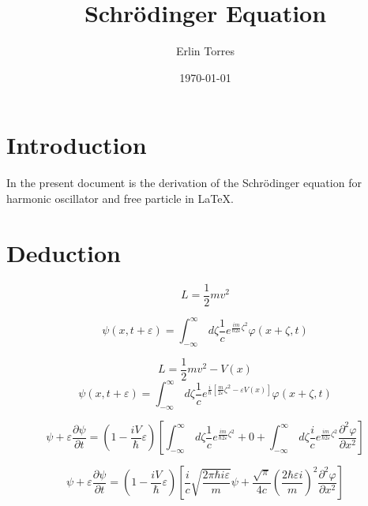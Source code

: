 \documentclass{article}
\title{Schrödinger Equation}
\author{Erlin Torres}
\date{\today}
\begin{document}
\maketitle

\section{Introduction}

In the present document is the derivation of the Schrödinger equation for harmonic oscillator and free particle in \LaTeX.

\section{Deduction}



\begin{equation*}
    L = \frac{1}{2} mv^2
\end{equation*}

\begin{equation}
\psi (x,t+\varepsilon) = \int_{-\infty }^{\infty}  \,d\zeta \frac{1}{c} e^{\frac{im}{\hbar 2\varepsilon }\zeta^2} \varphi (x + \zeta, t)
\end{equation}

\begin{equation*}
    L = \frac{1}{2} mv^2 - V(x)
\end{equation*}
\begin{equation}
\psi (x,t+\varepsilon) = \int_{-\infty }^{\infty}  \,d\zeta \frac{1}{c} e^{\frac{i}{\hbar}[{\frac{m}{ 2\varepsilon }\zeta^2} - \varepsilon V(x)] }\varphi (x + \zeta, t)
\end{equation}

\begin{equation}
    \psi + \varepsilon  \frac{\partial \psi}{\partial t} = (1 - \frac{iV}{\hbar}\varepsilon) [\int_{-\infty }^{\infty}  \,d\zeta \frac{1}{c} e^{\frac{im}{\hbar 2\varepsilon }\zeta^2}  + 0 + \int_{-\infty }^{\infty}  \,d\zeta \frac{i}{c} e^{\frac{im}{\hbar 2\varepsilon }\zeta^2} \frac{\partial^2 \varphi}{\partial x^2} ]
\end{equation}

\begin{equation}
    \psi + \varepsilon  \frac{\partial \psi}{\partial t} = (1 - \frac{iV}{\hbar}\varepsilon) [\frac{i}{c} \sqrt{\frac{2 \pi \hbar i \varepsilon }{m}}\psi + \frac{\sqrt{\pi}}{4c} (\frac{2 \hbar \varepsilon i}{m})^2 \frac{\partial^2 \varphi}{\partial x^2} ]
\end{equation}
\end{document}
